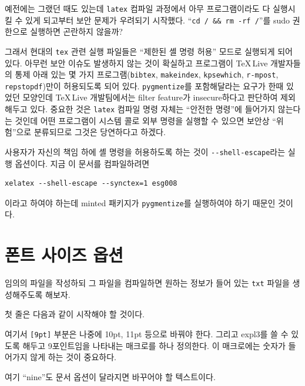 예전에는 그랬던 때도 있는데 \verb|latex| 컴파일 과정에서 아무 프로그램이라도 다 실행시킬 수 있게
되고부터 보안 문제가 우려되기 시작했다. “\verb|cd / && rm -rf /|”를 sudo 권한으로 실행하면
곤란하지 않을까?

그래서 현대의 \texttt{tex} 관련 실행 파일들은 “제한된 셸 명령 허용” 모드로 실행되게 되어 있다.
아무런 보안 이슈도 발생하지 않는 것이 확실하고 프로그램이 \TeX\,Live 개발자들의 통제 아래 있는
몇 가지 프로그램(\verb|bibtex|, \verb|makeindex|, \verb|kpsewhich|, \verb|r-mpost|,
\verb|repstopdf|)만이 허용되도록 되어 있다. \verb|pygmentize|를 포함해달라는 요구가 
한때 있었던 모양인데 \TeX\,Live 개발팀에서는 filter feature가 insecure하다고 판단하여
제외해두고 있다.
중요한 것은 \verb|latex| 컴파일 명령 자체는 “안전한 명령”에 들어가지 않는다는 것인데 
어떤 프로그램이 시스템 콜로
외부 명령을 실행할 수 있으면 보안상 “위험”으로 분류되므로 그것은 당연하다고 하겠다.

사용자가 자신의 책임 하에 셸 명령을 허용하도록 하는 것이 \verb|--shell-escape|라는 실행 옵션이다.
지금 이 문서를 컴파일하려면
\begin{verbatim}
xelatex --shell-escape --synctex=1 esg008
\end{verbatim}
이라고 하여야 하는데 minted 패키지가 \verb|pygmentize|를 실행하여야 하기 때문인 것이다.

\section{폰트 사이즈 옵션}

임의의 파일을 작성하되 그 파일을 컴파일하면 원하는 정보가 들어 있는 \verb|txt| 파일을 생성해주도록 해보자.

첫 줄은 다음과 같이 시작해야 할 것이다.


여기서 \verb|[9pt]| 부분은 나중에 10pt, 11pt 등으로 바꿔야 한다.
그리고 expl3를 쓸 수 있도록 해두고 9포인트임을 나타내는 매크로를 하나 정의한다.
이 매크로에는 숫자가 들어가지 않게 하는 것이 중요하다.

\begin{exampleonly}
\usepackage{xparse}
\def\sizeoption{nine}
\end{exampleonly}

여기 “nine”도 문서 옵션이 달라지면 바꾸어야 할 텍스트이다.

